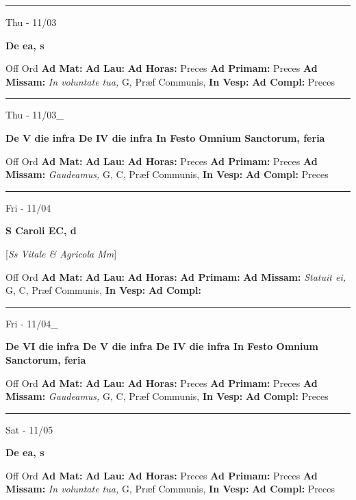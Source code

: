 \documentclass[letterpaper, 10pt]{article}
\begin{document}
\hrule
\begin{center}
Thu - 11/03
\end{center}\textbf{ \large De ea, \textnormal{\normalsize s}}
\begin{justify}
Off Ord
\textbf{Ad Mat: }
\textbf{Ad Lau: }
\textbf{Ad Horas: }Preces
\textbf{Ad Primam: }Preces
\textbf{Ad Missam:} \textit{In voluntate tua, } G, Præf Communis, 
\textbf{In Vesp: }
\textbf{Ad Compl: }Preces\end{justify}



\hrule
\begin{center}
Thu - 11/03\_
\end{center}\textbf{ \large De V die infra De IV die infra In Festo Omnium Sanctorum, \textnormal{\normalsize feria}}
\begin{justify}
Off Ord
\textbf{Ad Mat: }
\textbf{Ad Lau: }
\textbf{Ad Horas: }Preces
\textbf{Ad Primam: }Preces
\textbf{Ad Missam:} \textit{Gaudeamus, } G, C, Præf Communis, 
\textbf{In Vesp: }
\textbf{Ad Compl: }Preces\end{justify}



\hrule
\begin{center}
Fri - 11/04
\end{center}\textbf{ \large S Caroli EC, \textnormal{\normalsize d}}

[\textit{Ss Vitale \& Agricola Mm}]
\begin{justify}
Off Ord
\textbf{Ad Mat: }
\textbf{Ad Lau: }
\textbf{Ad Horas: }
\textbf{Ad Primam: }
\textbf{Ad Missam:} \textit{Statuit ei, } G, C, Præf Communis, 
\textbf{In Vesp: }
\textbf{Ad Compl: }\end{justify}



\hrule
\begin{center}
Fri - 11/04\_
\end{center}\textbf{ \large De VI die infra De V die infra De IV die infra In Festo Omnium Sanctorum, \textnormal{\normalsize feria}}
\begin{justify}
Off Ord
\textbf{Ad Mat: }
\textbf{Ad Lau: }
\textbf{Ad Horas: }Preces
\textbf{Ad Primam: }Preces
\textbf{Ad Missam:} \textit{Gaudeamus, } G, C, Præf Communis, 
\textbf{In Vesp: }
\textbf{Ad Compl: }Preces\end{justify}



\hrule
\begin{center}
Sat - 11/05
\end{center}\textbf{ \large De ea, \textnormal{\normalsize s}}
\begin{justify}
Off Ord
\textbf{Ad Mat: }
\textbf{Ad Lau: }
\textbf{Ad Horas: }Preces
\textbf{Ad Primam: }Preces
\textbf{Ad Missam:} \textit{In voluntate tua, } G, Præf Communis, 
\textbf{In Vesp: }
\textbf{Ad Compl: }Preces\end{justify}
\end{document}
